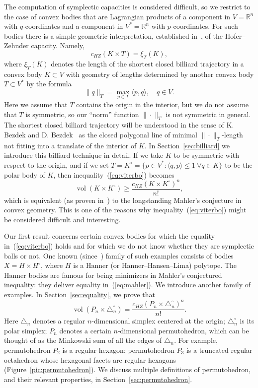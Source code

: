 \documentclass[12pt,a4paper,oneside]{amsart}
\theoremstyle{definition}
\theoremstyle{remark}
\numberwithin{equation}{section}
\DeclareMathOperator{\volu}{vol}
\begin{document}
The computation of symplectic capacities is considered difficult, so we restrict to the case of convex bodies that are Lagrangian products of a component in $V = \mathbb R^n$ with $q$-coordinates and a component in $V^* = \mathbb R^n$ with $p$-coordinates. For such bodies there is a simple geometric interpretation, established in~\cite{artstein2014bounds}, of the Hofer--Zehnder capacity. Namely,
$$
c_{HZ}(K \times T) = \xi_T(K),
$$
where $\xi_T(K)$ denotes the length of the shortest closed billiard trajectory in a convex body $K \subset V$ with geometry of lengths determined by another convex body $T \subset V^*$ by the formula
$$
\|q\|_T = \max_{p\in T} \langle p, q \rangle, \quad q \in V.
$$
Here we assume that $T$ contains the origin in the interior, but we do not assume that $T$ is symmetric, so our ``norm'' function $\|\cdot\|_T$ is not symmetric in general. The shortest closed billiard trajectory will be understood in the sense of K. Bezdek and D. Bezdek~\cite{bezdek2009shortest} as the closed polygonal line of minimal $\|\cdot\|_T$-length not fitting into a translate of the interior of $K$. In Section~\ref{sec:billiard} we introduce this billiard technique in detail. If we take $K$ to be symmetric with respect to the origin, and if we set $T = K^\circ = \{p \in V^*: \langle q, p \rangle \le 1 ~\forall q\in K\}$ to be the polar body of $K$, then inequality~(\ref{eq:viterbo}) becomes
\begin{equation}
\label{eq:mahler}
\volu (K \times K^\circ) \ge \frac{c_{HZ}(K\times K^\circ)^n}{n!},
\end{equation}
which is equivalent (as proven in~\cite{artstein2014from}) to the longstanding Mahler's conjecture in convex geometry. This is one of the reasons why inequality~(\ref{eq:viterbo}) might be considered difficult and interesting.

Our first result concerns certain convex bodies for which the equality in~(\ref{eq:viterbo}) holds and for which we do not know whether they are symplectic balls or not. One known (since~\cite{artstein2014from}) family of such examples consists of bodies $X = H \times H^\circ$, where $H$ is a Hanner (or Hanner--Hansen--Lima) polytope. The Hanner bodies are famous for being minimizers in Mahler's conjectured inequality: they deliver equality in~(\ref{eq:mahler}).
We introduce another family of examples. In Section~\ref{sec:equality}, we prove that
$$
\volu (P_n \times \triangle_n^\circ) = \frac{c_{HZ}(P_n \times \triangle_n^\circ)^n}{n!}.
$$
Here $\triangle_n$ denotes a regular $n$-dimensional simplex centered at the origin; $\triangle_n^\circ$ is its polar simplex; $P_n$ denotes a certain $n$-dimensional permutohedron, which can be thought of as the Minkowski sum of all the edges of $\triangle_n$. For example, permutohedron $P_2$ is a regular hexagon; permutohedron $P_3$ is a truncated regular octahedron whose hexagonal facets are regular hexagons (Figure~\ref{pic:permutohedron}). We discuss multiple definitions of permutohedron, and their relevant properties, in Section~\ref{sec:permutohedron}.
\end{document}
